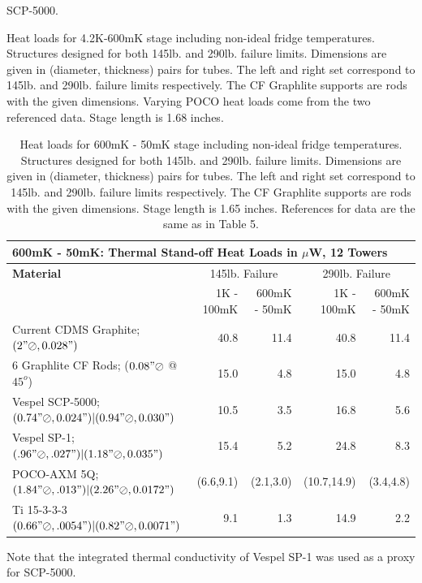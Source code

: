 \documentclass{article}
\begin{document}
\begin{table}[h]
\begin{small}
\begin{threeparttable}
\begin{tablenotes}
    SCP-5000.
\end{tablenotes}
\end{threeparttable}
\caption{Heat loads for 4.2K-600mK stage including non-ideal fridge temperatures. Structures designed for both 145lb. and 290lb. failure limits. Dimensions are given in (diameter, thickness) pairs for tubes. The left and right set correspond to 145lb. and 290lb. failure limits respectively. The CF Graphlite supports are rods with the given dimensions. Varying POCO heat loads come from the two referenced data. Stage length is 1.68 inches.}
\end{small}
\end{table}

\begin{table}[h]
\begin{small}
\begin{threeparttable}
\begin{tabular}{lrrrr}
  \multicolumn{5}{l}{{\Large 600mK - 50mK: Thermal Stand-off Heat Loads in $\mu$W, 12 Towers}} \\
\toprule
\bf{{\large Material}}& \multicolumn{2}{c}{145lb. Failure} & \multicolumn{2}{c}{290lb. Failure} \\
\cmidrule(r){2-5}
& 1K - 100mK & 600mK - 50mK & 1K - 100mK & 600mK - 50mK \\
Current CDMS Graphite; $(2"\oslash,0.028")$  & 40.8 & 11.4 & 40.8 & 11.4\\
6 Graphlite CF Rods; ($0.08" \oslash$ @ $45^{o}$) & 15.0 & 4.8 & 15.0 & 4.8 \\
Vespel SCP-5000; $(0.74"\oslash,0.024")|(0.94"\oslash,0.030")$ & 10.5\tnote{\dag} & 3.5\tnote{\dag} & 16.8\tnote{\dag} & 5.6\tnote{\dag} \\
Vespel SP-1; $(.96"\oslash,.027")|(1.18"\oslash,0.035")$ & 15.4 & 5.2 & 24.8 & 8.3 \\
POCO-AXM 5Q; $(1.84"\oslash,.013")|(2.26"\oslash,0.0172")$ & (6.6,9.1) & (2.1,3.0) & (10.7,14.9) & (3.4,4.8) \\
Ti 15-3-3-3 $(0.66"\oslash,.0054")|(0.82"\oslash,0.0071")$ & 9.1\tnote{\S} & 1.3\tnote{\S} & 14.9\tnote{\S} & 2.2\tnote{\S} \\
\bottomrule
\end{tabular}
\begin{tablenotes}
\item[\dag] Note that the integrated thermal conductivity of Vespel SP-1 was used as a proxy for SCP-5000.
\end{tablenotes}
\end{threeparttable}
\caption{Heat loads for 600mK - 50mK stage including non-ideal fridge temperatures. Structures designed for both 145lb. and 290lb. failure limits. Dimensions are given in (diameter, thickness) pairs for tubes. The left and right set correspond to 145lb. and 290lb. failure limits respectively. The CF Graphlite supports are rods with the given dimensions. Stage length is 1.65 inches. References for data are the same as in Table 5.}
\end{small}
\end{table}
\end{document}
